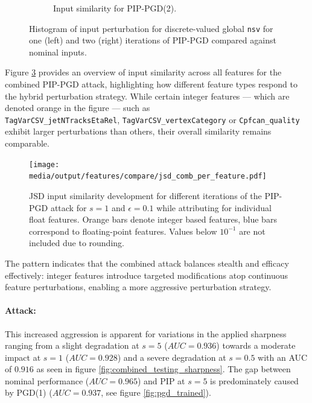 \begin{figure}[htbp]
\begin{subfigure}[t]{0.5\textwidth}
    \caption{Input similarity for PIP-PGD(2).}
    \label{fig:middle}
  \end{subfigure}\hfill

  \caption{Histogram of input perturbation for discrete-valued global \texttt{nsv} for one (left) and two (right) iterations of PIP-PGD compared against nominal inputs.}
  \label{fig:combined_input_vtxAss}
\end{figure}

Figure \ref{fig:combined_joint_overview} provides an overview of input similarity across all features for the combined PIP-PGD attack, highlighting how different feature types respond to the hybrid perturbation strategy. While certain integer features — which are denoted orange in the figure — such as \\ \texttt{TagVarCSV\_jetNTracksEtaRel}, \texttt{TagVarCSV\_vertexCategory} or \texttt{Cpfcan\_quality} exhibit larger perturbations than others, their overall similarity remains comparable.


\begin{figure}[H]
\centering
    \texttt{[image: media/output/features/compare/jsd\_comb\_per\_feature.pdf]}
    \caption{JSD input similarity development for different iterations of the PIP-PGD attack for $s=1$ and $\epsilon=0.1$ while attributing for individual float features. Orange bars denote integer based features, blue bars correspond to floating-point features. Values below $10^{-1}$ are not included due to rounding.}
    \label{fig:combined_joint_overview}
\end{figure}

The pattern indicates that the combined attack balances stealth and efficacy effectively: integer features introduce targeted modifications atop continuous feature perturbations, enabling a more aggressive perturbation strategy. 

\paragraph{Attack:} This increased aggression is apparent for variations in the applied sharpness ranging from a slight degradation at $s=5$ ($AUC=0.936$) towards a moderate impact at $s=1$ ($AUC=0.928$) and a severe degradation at $s=0.5$ with an AUC of $0.916$  as seen in figure \ref{fig:combined_testing_sharpness}. The gap between nominal performance ($AUC=0.965$) and PIP at $s=5$ is predominately caused by PGD(1) ($AUC=0.937$, see figure \ref{fig:pgd_trained}).


